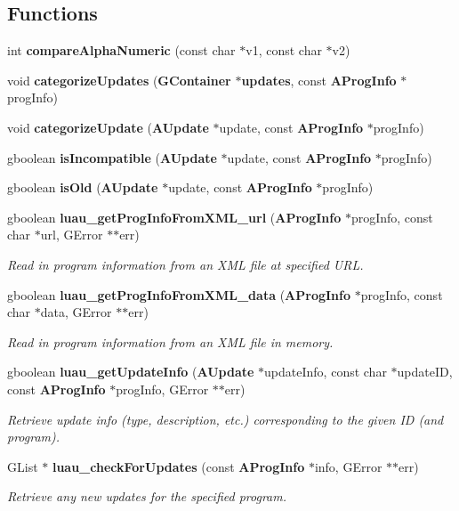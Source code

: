 \subsection*{Functions}
\begin{CompactItemize}
\item 
int {\bf compare\-Alpha\-Numeric} (const char $\ast$v1, const char $\ast$v2)
\item 
void {\bf categorize\-Updates} ({\bf GContainer} $\ast${\bf updates}, const {\bf AProg\-Info} $\ast$prog\-Info)
\item 
void {\bf categorize\-Update} ({\bf AUpdate} $\ast$update, const {\bf AProg\-Info} $\ast$prog\-Info)
\item 
gboolean {\bf is\-Incompatible} ({\bf AUpdate} $\ast$update, const {\bf AProg\-Info} $\ast$prog\-Info)
\item 
gboolean {\bf is\-Old} ({\bf AUpdate} $\ast$update, const {\bf AProg\-Info} $\ast$prog\-Info)
\item 
gboolean {\bf luau\_\-get\-Prog\-Info\-From\-XML\_\-url} ({\bf AProg\-Info} $\ast$prog\-Info, const char $\ast$url, GError $\ast$$\ast$err)
\begin{CompactList}\small\item\em Read in program information from an XML file at specified URL. \item\end{CompactList}\item 
gboolean {\bf luau\_\-get\-Prog\-Info\-From\-XML\_\-data} ({\bf AProg\-Info} $\ast$prog\-Info, const char $\ast$data, GError $\ast$$\ast$err)
\begin{CompactList}\small\item\em Read in program information from an XML file in memory. \item\end{CompactList}\item 
gboolean {\bf luau\_\-get\-Update\-Info} ({\bf AUpdate} $\ast$update\-Info, const char $\ast$update\-ID, const {\bf AProg\-Info} $\ast$prog\-Info, GError $\ast$$\ast$err)
\begin{CompactList}\small\item\em Retrieve update info (type, description, etc.) corresponding to the given ID (and program). \item\end{CompactList}\item 
GList $\ast$ {\bf luau\_\-check\-For\-Updates} (const {\bf AProg\-Info} $\ast$info, GError $\ast$$\ast$err)
\begin{CompactList}\small\item\em Retrieve any new updates for the specified program. \item\end{CompactList}\item 

\end{CompactItemize}

